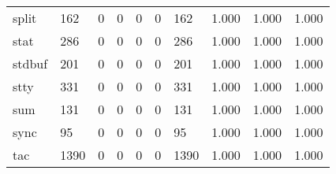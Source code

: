 \begin{longtable}{lp{1.3cm}p{1.3cm}p{1.3cm}p{1.3cm}p{1.3cm}p{1.3cm}p{1.3cm}p{1.3cm}p{1.3cm}}
split     &                    162 &                                  0 &                                 0 &                                0 &                                 0 &                             162 &                                1.000 &                                  1.000 &                                1.000 \\
stat      &                    286 &                                  0 &                                 0 &                                0 &                                 0 &                             286 &                                1.000 &                                  1.000 &                                1.000 \\
stdbuf    &                    201 &                                  0 &                                 0 &                                0 &                                 0 &                             201 &                                1.000 &                                  1.000 &                                1.000 \\
stty      &                    331 &                                  0 &                                 0 &                                0 &                                 0 &                             331 &                                1.000 &                                  1.000 &                                1.000 \\
sum       &                    131 &                                  0 &                                 0 &                                0 &                                 0 &                             131 &                                1.000 &                                  1.000 &                                1.000 \\
sync      &                     95 &                                  0 &                                 0 &                                0 &                                 0 &                              95 &                                1.000 &                                  1.000 &                                1.000 \\
tac       &                   1390 &                                  0 &                                 0 &                                0 &                                 0 &                            1390 &                                1.000 &                                  1.000 &                                1.000 \\

\end{longtable}
